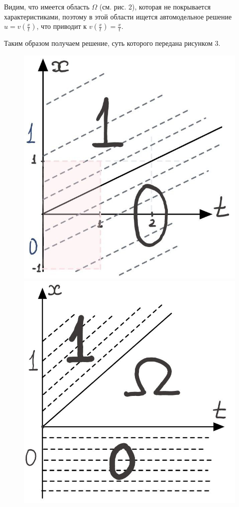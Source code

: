 \documentclass[a4paper,12pt]{article}
\begin{document}
Видим, что имеется область $\Omega$  (см. рис. 2), которая не покрывается характеристиками, поэтому в этой области ищется автомодельное решение $u=v(\frac{x}{t})$, что приводит к  $v(\frac{x}{t})=\frac{x}{t}$.

Таким образом получаем решение, суть которого передана рисунком 3.
\begin{figure}[h]
    \begin{center}
    \begin{minipage}[h]{0.3\linewidth}
    \includegraphics[width=0.8\linewidth]{photo1.jpg}
    \caption{}
    \end{minipage}
    \hfill
    \begin{minipage}[h]{0.3\linewidth}
    \includegraphics[width=0.8\linewidth]{photo2.jpg}

\end{minipage}
\end{center}
\end{figure}
\end{document}
